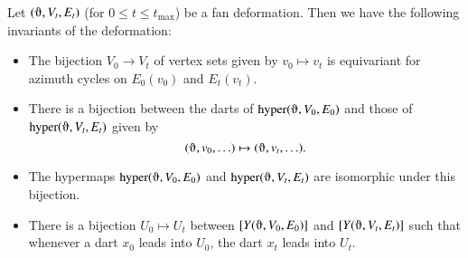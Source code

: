 \begin{lemma}
Let $(\orgn,V_t,E_t)$ (for $0\le t\le t_{\text{max}}$) 
be a fan deformation. Then we have the following invariants
of the deformation:
\begin{itemize}
\item {} 
The bijection $V_0\to V_t$ of vertex sets
given by $v_0\mapsto v_t$ 
is equivariant for
azimuth cycles on $E_0(v_0)$ and $E_t(v_t)$.
\item {} 
There is a bijection between the darts of $\op{hyper}(\orgn,V_0,E_0)$
and those of $\op{hyper}(\orgn,V_t,E_t)$ given by
   $$(\orgn,v_0,\ldots) \mapsto (\orgn,v_t,\ldots).$$
\item {} 
The hypermaps $\op{hyper}(\orgn,V_0,E_0)$ and $\op{hyper}(\orgn,V_t,E_t)$
are isomorphic under this bijection.
\item {} 
There is a bijection $U_0\mapsto U_t$ 
between $\comp{Y(\orgn,V_0,E_0)}$
and $\comp{Y(\orgn,V_t,E_t)}$ such that whenever a
dart $x_0$ leads into
$U_0$, the dart $x_t$ leads into
$U_t$.
\end{itemize}
\end{lemma}


